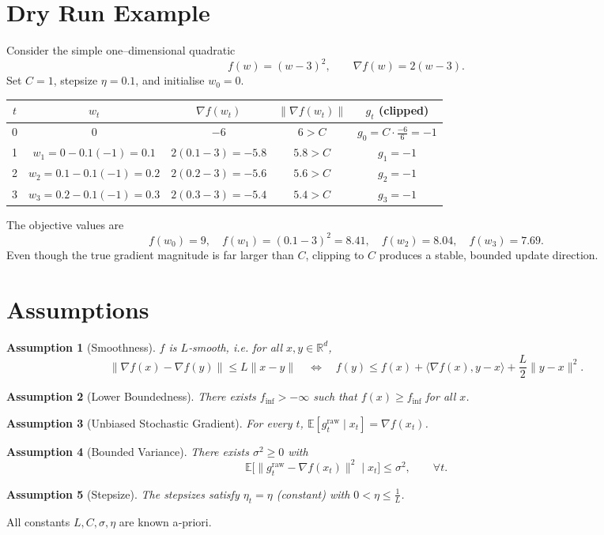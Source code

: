 \documentclass{article}
\newtheorem{assumption}{Assumption}
\begin{document}
\section*{Dry Run Example}
Consider the simple one–dimensional quadratic
\[
f(w)=(w-3)^2 ,
\qquad \nabla f(w)=2(w-3).
\]
Set $C=1$, stepsize $\eta=0.1$, and initialise $w_0=0$.

\begin{center}
\begin{tabular}{c|c|c|c|c}
$t$ & $w_t$ & $\nabla f(w_t)$ & $\| \nabla f(w_t)\|$ & $g_t$ (clipped) \\ \hline
0 & $0$ & $-6$ & $6> C$ & $g_0 = C\cdot\frac{-6}{6}= -1$ \\[4pt]
1 & $w_1 = 0-0.1(-1)=0.1$ & $2(0.1-3)=-5.8$ & $5.8> C$ & $g_1 = -1$ \\[4pt]
2 & $w_2 = 0.1-0.1(-1)=0.2$ & $2(0.2-3)=-5.6$ & $5.6> C$ & $g_2 = -1$ \\[4pt]
3 & $w_3 = 0.2-0.1(-1)=0.3$ & $2(0.3-3)=-5.4$ & $5.4> C$ & $g_3 = -1$ 
\end{tabular}
\end{center}
The objective values are
\[
f(w_0)=9,\quad f(w_1)= (0.1-3)^2 = 8.41,\quad
f(w_2)=8.04,\quad f(w_3)=7.69 .
\]
Even though the true gradient magnitude is far larger than $C$, clipping to $C$
produces a stable, bounded update direction.

\section*{Assumptions}
\begin{assumption}[Smoothness]\label{ass:smooth}
$f$ is $L$‑smooth, i.e. for all $x,y\in\mathbb{R}^d$,
\[
\|\nabla f(x)-\nabla f(y)\|\le L\|x-y\|\quad\Longleftrightarrow\quad
f(y)\le f(x)+\langle\nabla f(x),y-x\rangle+\frac{L}{2}\|y-x\|^2 .
\]
\end{assumption}
\begin{assumption}[Lower Boundedness]\label{ass:lb}
There exists $f_{\inf}>-\infty$ such that $f(x)\ge f_{\inf}$ for all $x$.
\end{assumption}
\begin{assumption}[Unbiased Stochastic Gradient]\label{ass:unbiased}
For every $t$, $\mathbb{E}[g_t^{\text{raw}}\mid x_t]=\nabla f(x_t)$.
\end{assumption}
\begin{assumption}[Bounded Variance]\label{ass:variance}
There exists $\sigma^2\ge0$ with
\[
\mathbb{E}\bigl[\|g_t^{\text{raw}}-\nabla f(x_t)\|^2\mid x_t\bigr]\le\sigma^2,
\qquad\forall t .
\]
\end{assumption}
\begin{assumption}[Stepsize]\label{ass:stepsize}
The stepsizes satisfy $\eta_t=\eta$ (constant) with
$0<\eta\le \frac{1}{L}$.
\end{assumption}
All constants $L,C,\sigma,\eta$ are known a‑priori.
\end{document}
